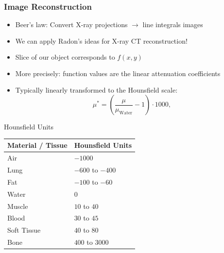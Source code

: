 \begin{frame}
	\frametitle{Image Reconstruction}

	\begin{itemize}
		\setlength\itemsep{0.3cm}
		\item Beer's law: Convert X-ray projections $\rightarrow$ line integrals images
		\item We can apply Radon's ideas for X-ray CT reconstruction!
		\item Slice of our object corresponds to $f(x,y)$
		\item More precisely: function values are the linear attenuation coefficients
		\item Typically linearly transformed to the Hounsfield scale:
		      \begin{equation}
			      \mu^* = \left( \frac{\mu}{\mu_\text{Water}} - 1 \right) \cdot 1000,
		      \end{equation}
	\end{itemize}

\end{frame}

\begin{frame}[c]{Hounsfield Units}

	\begin{table}[tbp]
		\centering
		\begin{tabular}{ll}
			\toprule
			Material / Tissue & Hounsfield Units \\
			\midrule
			Air               & $-1000$          \\
			Lung              & $-600$ to $-400$ \\
			Fat               & $-100$ to $-60$  \\
			Water             & $0$              \\
			Muscle            & $10$ to $40$     \\
			Blood             & $30$ to $45$     \\
			Soft Tissue       & $40$ to $80$     \\
			Bone              & $400$ to $3000$  \\
			\bottomrule
		\end{tabular}%
		\label{tab:ct_reco_1}
	\end{table}

\end{frame}


